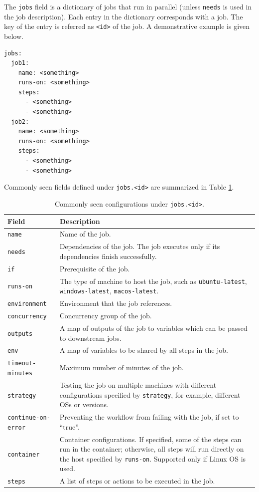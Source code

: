 The \verb|jobs| field is a dictionary of jobs that run in parallel (unless \verb|needs| is used in the job description). Each entry in the dictionary corresponds with a job. The key of the entry is referred as \verb|<id>| of the job. A demonstrative example is given below.
\begin{lstlisting}
jobs:
  job1:
    name: <something>
    runs-on: <something>
    steps:
      - <something>
      - <something>
  job2:
    name: <something>
    runs-on: <something>
    steps:
      - <something>
      - <something>
\end{lstlisting}
Commonly seen fields defined under \texttt{jobs.<id>} are summarized in Table \ref{tab:githubactions_jobs}.
\begin{table}[!htb]
	\centering \caption{Commonly seen configurations under \texttt{jobs.<id>}.}\label{tab:githubactions_jobs}
	\begin{tabularx}{\textwidth}{lX}
		\hline
		Field & Description \\ \hline
        \texttt{name} & Name of the job. \\
        \texttt{needs} & Dependencies of the job. The job executes only if its dependencies finish successfully.\\
        \texttt{if} & Prerequisite of the job. \\
        \texttt{runs-on} & The type of machine to host the job, such as \texttt{ubuntu-latest}, \texttt{windows-latest}, \texttt{macos-latest}. \\
        \texttt{environment} & Environment that the job references. \\
        \texttt{concurrency} & Concurrency group of the job. \\
        \texttt{outputs} & A map of outputs of the job to variables which can be passed to downstream jobs. \\
        \texttt{env} & A map of variables to be shared by all steps in the job. \\
        \texttt{timeout-minutes} & Maximum number of minutes of the job. \\
        \texttt{strategy} & Testing the job on multiple machines with different configurations specified by \texttt{strategy}, for example, different OSs or versions. \\
        \texttt{continue-on-error} & Preventing the workflow from failing with the job, if set to ``true''. \\
        \texttt{container} & Container configurations. If specified, some of the steps can run in the container; otherwise, all steps will run directly on the host specified by \texttt{runs-on}. Supported only if Linux OS is used. \\
        \texttt{steps} & A list of steps or actions to be executed in the job. \\
		\hline
	\end{tabularx}
\end{table}

